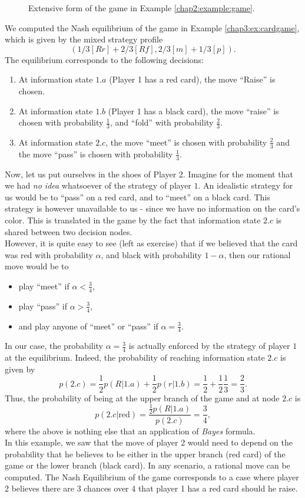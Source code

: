 \begin{example}
\begin{figure}[!ht]
\caption{Extensive form of the game in Example \ref{chap2:example:game}.}
\label{chap4:example:figtree}
\end{figure}
 We computed the Nash equilibrium of the game in Example \ref{chap3:ex:cardgame}, which is given by the mixed strategy profile 
$$(1/3[Rr] + 2/3[Rf], 2/3[m] + 1/3[p]).$$ 
The equilibrium corresponds to the following decisions:
\begin{enumerate}
\item At information state $1.a$ (Player 1 has a red card), the move ``Raise'' is chosen.
\item At information state $1.b$ (Player 1 has a black card), the move ``raise'' is chosen with probability $\frac{1}{3}$, and ``fold'' with probability $\frac{2}{3}$.
\item At information state $2.c$, the move ``meet'' is chosen with probability $\frac{2}{3}$ and the move ``pass'' is chosen with probability $\frac{1}{3}$. 
\end{enumerate} 
Now, let us put ourselves in the shoes of Player 2. Imagine for the moment that we had \emph{no idea} whatsoever of the strategy of player $1$.  An idealistic strategy for us would be to ``pass'' on a red card, and to ``meet'' on a black card. This strategy is however unavailable to us - since we have no information on the card's color. This is translated in the game by the fact that information state $2.c$ is shared between two decision nodes.\\
However, it is quite easy to see (left as exercise) that  if we believed that the card was red with probability $\alpha$, and black with probability $1-\alpha$, then our rational move would be to
\begin{itemize}
\item play ``meet'' if $\alpha < \frac{3}{4}$,
\item play ``pass'' if $\alpha > \frac{3}{4}$,
\item and play anyone of ``meet'' or ``pass'' if $\alpha = \frac{3}{4}$.
\end{itemize}
In our case, the probability $\alpha = \frac{3}{4}$ is actually enforced by the strategy of player $1$ at the equilibrium. 
Indeed, the probability of reaching information state $2.c$ is given by 
$$ p(2.c) = \frac{1}{2}p(R | 1.a) + \frac{1}{2} p(r |  1.b) = \frac{1}{2} + \frac{1}{2} \frac{1}{3} = \frac{2}{3}. $$
Thus, the probability of being at the upper branch of the game and at node $2.c$ is 
$$ p(2.c |  \text{red}) = \frac{\frac{1}{2}p(R | 1.a)}{p(2.c)} = \frac{3}{4},$$
where the above is nothing else that an application of \emph{Bayes} formula.\\

In this example, we saw that the move of player 2 would need to depend on the probability that he believes to be either in the upper branch (red card) of the game or the lower branch (black card). In any scenario, a rational move can be computed. The Nash Equilibrium of the game corresponds to a case where player 2 believes there are 3 chances over 4 that player 1 has a red card should he raise.


\end{example}

